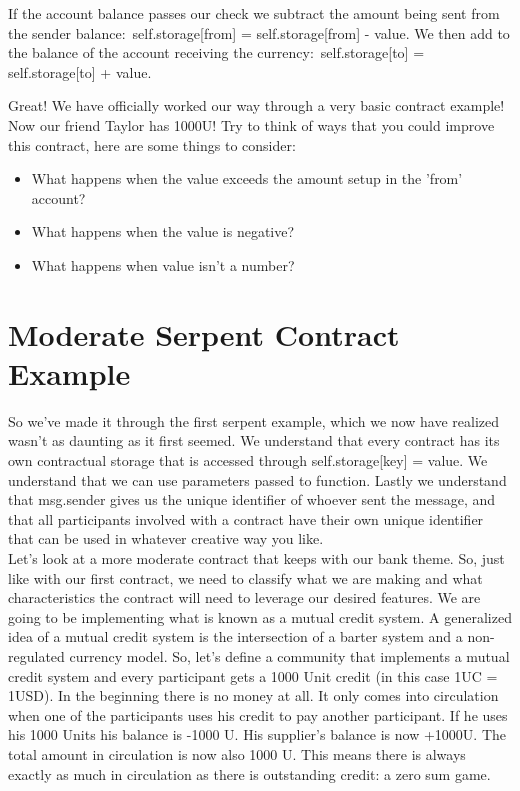 \documentclass[12pt]{article}
\begin{document}
If the account balance passes our check we subtract the amount being sent from the sender balance: self.storage[from] = self.storage[from] - value. We then add to the balance of the account receiving the currency: self.storage[to] = self.storage[to] + value.

Great! We have officially worked our way through a very basic contract example! Now our friend Taylor has 1000U! Try to think of ways that you could improve this contract, here are some things to consider:

\begin{itemize}
\item What happens when the value exceeds the amount setup in the 'from' account?
\item What happens when the value is negative?
\item What happens when value isn't a number?
\end{itemize}


\section{Moderate Serpent Contract Example}

	So we've made it through the first serpent example, which we now have realized wasn't as daunting as it first seemed. We understand that every contract has its own contractual storage that is accessed through self.storage[key] = value. We understand that we can use parameters passed to function. Lastly we understand that msg.sender gives us the unique identifier of whoever sent the message, and that all participants involved with a contract have their own unique identifier that can be used in whatever creative way you like. \\

Let's look at a more moderate contract that keeps with our bank theme. So, just like with our first contract, we need to classify what we are making and what characteristics the contract will need to leverage our desired features. We are going to be implementing what is known as a mutual credit system. A generalized idea of a mutual credit system is the intersection of a barter system and a non-regulated currency model. So, let's define a community that implements a mutual credit system and every participant gets a 1000 Unit credit (in this case 1UC = 1USD). In the beginning there is no money at all. It only comes into circulation when one of the participants uses his credit to pay another participant. If he uses his 1000 Units his balance is -1000 U. His supplier's balance is now +1000U. The total amount in circulation is now also 1000 U. This means there is always exactly as much in circulation as there is outstanding credit: a zero sum game.
\end{document}
